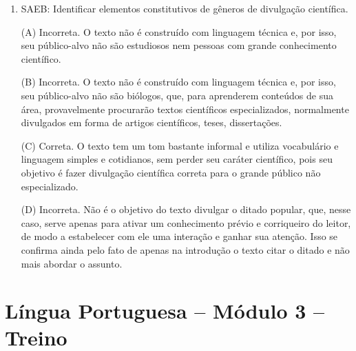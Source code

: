 \begin{enumerate}
(D) Correta. O
texto jornalístico, em geral, preza pela objetividade e pela isenção.
Uma das formas de atender a esses requisitos é citar entre aspas as
palavras de outrem. No texto em questão, as aspas foram usadas para
evitar assumir a responsabilidade por uma afirmação categórica feita, na
realidade, por uma instituição que tem legitimidade para tal (a
Organização Pan-Americana de Saúde). Isso significa que tal instituição
tem maior credibilidade, de modo que as aspas servem, ao mesmo tempo,
para comprovar que a notícia veicula informações reais já confirmadas
por instituição competente.

\item

SAEB: Identificar elementos constitutivos de gêneros de divulgação
científica.

(A) Incorreta. O texto não é construído com linguagem técnica e, por
isso, seu público-alvo não são estudiosos nem pessoas com grande
conhecimento científico.

(B) Incorreta. O texto não é construído com linguagem técnica e, por
isso, seu público-alvo não são biólogos, que, para aprenderem conteúdos
de sua área, provavelmente procurarão textos científicos especializados,
normalmente divulgados em forma de artigos científicos, teses,
dissertações.

(C) Correta. O texto tem um tom bastante informal e utiliza vocabulário
e linguagem simples e cotidianos, sem perder seu caráter científico,
pois seu objetivo é fazer divulgação científica correta para o grande
público não especializado.

(D) Incorreta. Não é o objetivo do texto divulgar o ditado popular, que,
nesse caso, serve apenas para ativar um conhecimento prévio e corriqueiro
do leitor, de modo a estabelecer com ele uma interação e ganhar sua
atenção. Isso se confirma ainda pelo fato de apenas na introdução o
texto citar o ditado e não mais abordar o assunto.
\end{enumerate}

\section*{Língua Portuguesa – Módulo 3 – Treino}

